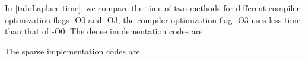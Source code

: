 \documentclass[10pt,a4paper]{article}
\theoremstyle{dotlessP}
\begin{document}
In \cref{tab:Laplace-time}, we compare the time of two methods for different compiler optimization flags -O0 and -O3, the compiler optimization flag -O3 uses less time than that of -O0.
\newpage
The dense implementation codes are


The sparse implementation codes are

\end{document}
